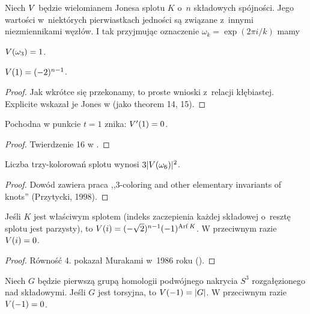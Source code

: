 Niech $V$ będzie wielomianem Jonesa splotu $K$ o~$n$ składowych spójności.
Jego wartości w~niektórych pierwiastkach jedności są związane z~innymi niezmiennikami węzłów.
I tak przyjmując oznaczenie $\omega_k = \exp(2\pi i/k)$ mamy

\begin{proposition} \label{jones_sharp_p_hard}
    $V(\omega_3) = 1$.
\end{proposition}

\begin{proposition}
    $V(1) = (-2)^{n-1}$.
\end{proposition}

\begin{proof}
    Jak wkrótce się przekonamy, to proste wnioski z~relacji kłębiastej.
    Explicite wskazał je Jones w \cite{jones85} (jako theorem 14, 15).
\end{proof}

\begin{proposition}
    Pochodna w punkcie $t = 1$ znika: $V'(1) = 0$.
\end{proposition}

\begin{proof}
    Twierdzenie 16 w \cite{jones85}.
\end{proof}

\begin{proposition}
    Liczba trzy-kolorowań splotu wynosi $3|V(\omega_6)|^2$.
\end{proposition}

\begin{proof}
    Dowód zawiera praca ,,3-coloring and other elementary invariants of knots'' (Przytycki, 1998).
\end{proof}

\begin{proposition}
    Jeśli $K$ jest właściwym splotem (indeks zaczepienia każdej składowej o~resztę splotu jest parzysty), to $V(i) = (-\sqrt 2)^{n-1}(-1)^{\operatorname{Arf} K}$.
    W przeciwnym razie $V(i) = 0$.
\end{proposition}

\begin{proof}
    Równość 4. pokazał Murakami w~1986 roku (\cite{murakami86}).
\end{proof}

\begin{proposition}
    Niech $G$ będzie pierwszą grupą homologii podwójnego nakrycia $S^3$ rozgałęzionego nad składowymi.
    Jeśli $G$ jest torsyjna, to $V(-1) = |G|$.
    W przeciwnym razie $V(-1) = 0$.
\end{proposition}

